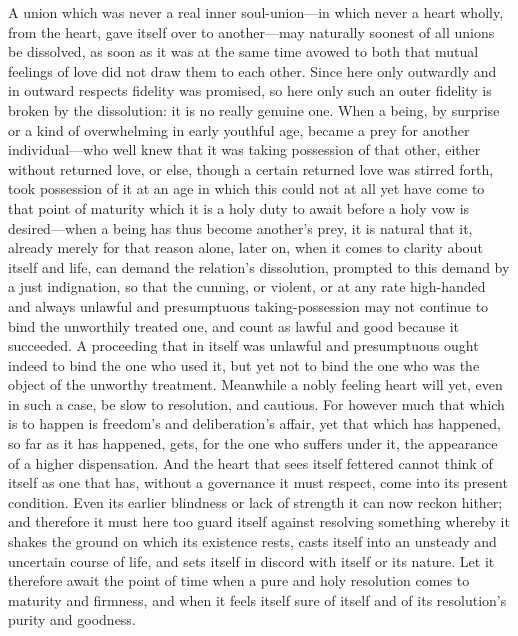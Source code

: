 \documentclass[12pt,a4paper]{book}
\begin{document}
A union which was never a real inner soul-union---in which never a heart
wholly, from the heart, gave itself over to another---may naturally soonest
of all unions be dissolved, as soon as it was at the same time avowed to
both that mutual feelings of love did not draw them to each other. Since
here only outwardly and in outward respects fidelity was promised, so here
only such an outer fidelity is broken by the dissolution: it is no really
genuine one. When a being, by surprise or a kind of overwhelming in early
youthful age, became a prey for another individual---who well knew that it
was taking possession of that other, either without returned love, or else,
though a certain returned love was stirred forth, took possession of it at
an age in which this could not at all yet have come to that point of
maturity which it is a holy duty to await before a holy vow is
desired---when a being has thus become another's prey, it is natural that
it, already merely for that reason alone, later on, when it comes to clarity
about itself and life, can demand the relation's dissolution, prompted to
this demand by a just indignation, so that the cunning, or violent, or at
any rate high-handed and always unlawful and presumptuous
taking-possession may not continue to bind the unworthily treated one, and
count as lawful and good because it succeeded. A proceeding that in itself
was unlawful and presumptuous ought indeed to bind the one who used it, but
yet not to bind the one who was the object of the unworthy treatment.
Meanwhile a nobly feeling heart will yet, even in such a case, be slow to
resolution, and cautious. For however much that which is to happen is
freedom's and deliberation's affair, yet that which has happened, so far as
it has happened, gets, for the one who suffers under it, the appearance of
a higher dispensation. And the heart that sees itself fettered cannot think
of itself as one that has, without a governance it must respect, come into
its present condition. Even its earlier blindness or lack of strength it
can now reckon hither; and therefore it must here too guard itself against
resolving something whereby it shakes the ground on which its existence
rests, casts itself into an unsteady and uncertain
course of life, and sets itself in discord with itself or its nature. Let
it therefore await the point of time when a pure and holy resolution comes
to maturity and firmness, and when it feels itself sure of itself and of
its resolution's purity and goodness.
\end{document}
